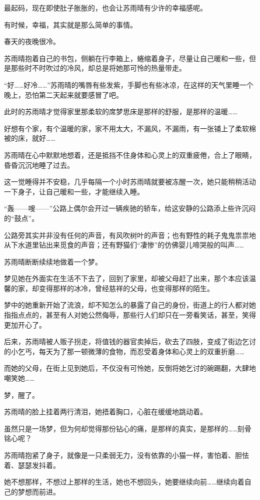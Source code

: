 最起码，现在即使肚子胀胀的，也会让苏雨晴有少许的幸福感呢。

有时候，幸福，其实就是那么简单的事情。

春天的夜晚很冷。

苏雨晴抱着自己的书包，侧躺在行李箱上，蜷缩着身子，尽量让自己暖和一些，但是那些时不时吹过的冷风，却总是将她那可怜的热量带走。

“好……好冷……”苏雨晴的嘴唇有些发紫，手脚也有些冰凉，在这样的天气里睡一个晚上，恐怕第二天起来就要感冒了吧。

此时的苏雨晴才觉得家里那柔软的席梦思床是那样的舒服，是那样的温暖……

好想有个家，有个温暖的家，家不用太大，不漏风，不漏雨，有一张铺上了柔软棉被的床，就好……

苏雨晴在心中默默地想着，还是抵挡不住身体和心灵上的双重疲倦，合上了眼睛，昏昏沉沉地睡了过去。

这一觉睡得并不安稳，几乎每隔一个小时苏雨晴就要被冻醒一次，她只能稍稍活动一下身子，让自己暖和一些，才能继续入睡。

“轰——嗖——”公路上偶尔会开过一辆疾驰的轿车，给这安静的公路添上些许沉闷的“鼓点”。

公路旁其实并非没有任何的声音，有风吹树叶的声音；也有野性的耗子鬼鬼祟祟地从下水道里钻出来觅食的声音；还有野猫们“凄惨”的仿佛婴儿啼哭般的叫声……

苏雨晴断断续续地做着一个梦。

梦见她在外面实在生活不下去了，回到了家里，却被父母赶了出来，那个本应该温馨的家，却变得那样的冰冷，曾经慈祥的父母，也变得那样的陌生。

梦中的她重新开始了流浪，却不知怎么的暴露了自己的身份，街道上的行人都对她指指点点的，甚至有人对她公然侮辱，那些行人们却只在一旁看笑话，甚至，笑得更加开心了。

后来，苏雨晴被人贩子拐走，将值钱的器官卖掉后，砍去了四肢，变成了街边乞讨的小乞丐，每天为了那一顿微薄的食物，而忍受着身体和心灵上的双重折磨……

而她的父母，在街上见到她后，不仅没有可怜她，反倒将她乞讨的碗踢翻，大肆地嘲笑她……

梦，醒了。

苏雨晴的脸上挂着两行清泪，她捂着胸口，心脏在缓缓地跳动着。

虽然只是一场梦，但为何却觉得那份钻心的痛，是那样的真实，是那样的……刻骨铭心呢？

苏雨晴抱紧了身子，就像是一只柔弱无力，没有依靠的小猫一样，害怕着、胆怯着、瑟瑟发抖着。

她不想那样，不想过上那样的生活，她也不想回头，她要继续向前……继续向着自己的梦想而前进。

